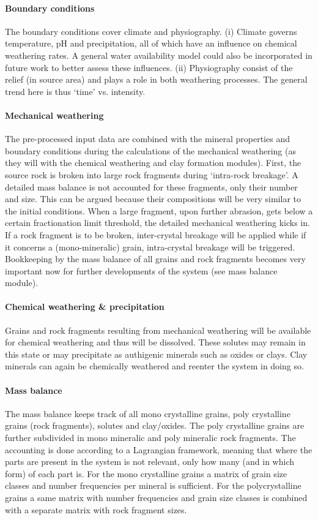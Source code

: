 \paragraph{Boundary conditions}
The boundary conditions cover climate and physiography. (i) Climate governs temperature, pH and precipitation, all of which have an influence on chemical weathering rates. A general water availability model could also be incorporated in future work to better assess these influences. (ii) Physiography consist of the relief (in source area) and plays a role in both weathering processes. The general trend here is thus ‘time’ vs. intensity. 

\paragraph{Mechanical weathering}
The pre-processed input data are combined with the mineral properties and boundary conditions during the calculations of the mechanical weathering (as they will with the chemical weathering and clay formation modules). First, the source rock is broken into large rock fragments during ‘intra-rock breakage’. A detailed mass balance is not accounted for these fragments, only their number and size. This can be argued because their compositions will be very similar to the initial conditions. When a large fragment, upon further abrasion, gets below a certain fractionation limit threshold, the detailed mechanical weathering kicks in. If a rock fragment is to be broken, inter-crystal breakage will be applied while if it concerns a (mono-mineralic) grain, intra-crystal breakage will be triggered. Bookkeeping by the mass balance of all grains and rock fragments becomes very important now for further developments of the system (see mass balance module).

\paragraph{Chemical weathering \& precipitation}
Grains and rock fragments resulting from mechanical weathering will be available for chemical weathering and thus will be dissolved. These solutes may remain in this state or may precipitate as authigenic minerals such as oxides or clays. Clay minerals can again be chemically weathered and reenter the system in doing so.

\paragraph{Mass balance}
The mass balance keeps track of all mono crystalline grains, poly crystalline grains (rock fragments), solutes and clay/oxides. The poly crystalline grains are further subdivided in mono mineralic and poly mineralic rock fragments. The accounting is done according to a Lagrangian framework, meaning that where the parts are present in the system is not relevant, only how many (and in which form) of each part is. For the mono crystalline grains a matrix of grain size classes and number frequencies per mineral is sufficient. For the polycrystalline grains a same matrix with number frequencies and grain size classes is combined with a separate matrix with rock fragment sizes.

